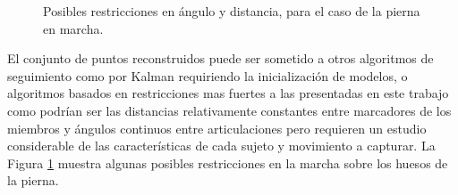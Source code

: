 \begin{figure}[ht!]
 \begin{center}
  \end{center}
\caption{Posibles restricciones en ángulo y distancia, para el caso de la pierna en marcha.}
\label{restricciones_tracking}
\end{figure}

El conjunto de puntos reconstruidos puede ser sometido a otros algoritmos de seguimiento como por Kalman \cite{kalman} requiriendo la inicialización de modelos, o algoritmos basados en restricciones mas fuertes a las presentadas en este trabajo como podrían ser las distancias relativamente constantes entre marcadores de los miembros y ángulos continuos entre articulaciones pero requieren un estudio considerable de las características de cada sujeto y movimiento a capturar. La Figura \ref{restricciones_tracking} muestra algunas posibles restricciones en la marcha sobre los huesos de la pierna.

